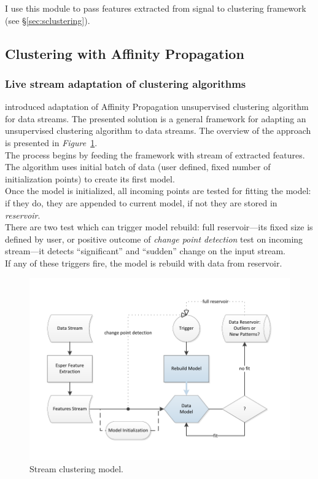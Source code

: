 \documentclass[11pt, letterpaper]{article}            %
\begin{document}
\noindent I use this module to pass features extracted from signal to clustering framework (see §\ref{sec:sclustering}).

\subsection{Clustering with Affinity Propagation\label{sec:sclustering}}

\subsubsection{Live stream adaptation of clustering algorithms\label{sec:livestream}}
\citep{zhang2013data} introduced adaptation of Affinity Propagation unsupervised clustering algorithm for data streams. The presented solution is a general framework for adapting an unsupervised clustering algorithm to data streams. The overview of the approach is presented in \emph{Figure}~\ref{fig:APC}.\\

The process begins by feeding the framework with stream of extracted features. The algorithm uses initial batch of data (user defined, fixed number of initialization points) to create its first model.\\
Once the model is initialized, all incoming points are tested for fitting the model: if they do, they are appended to current model, if not they are stored in \emph{reservoir}.\\
There are two test which can trigger model rebuild: full reservoir---its fixed size is defined by user, or positive outcome of \emph{change point detection} test on incoming stream---it detects ``significant'' and ``sudden'' change on the input stream.\\
If any of these triggers fire, the model is rebuild with data from reservoir.\\

\begin{figure}[htbp]
    \centering
    \includegraphics[width=\textwidth]{./gfx/APC_Presentation.pdf}
  \caption{Stream clustering model.\label{fig:APC}}
\end{figure}
\end{document}
